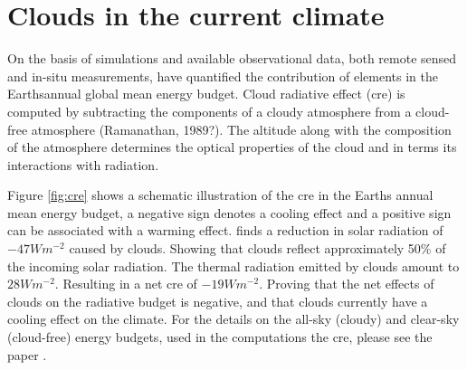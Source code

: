 \section{Clouds in the current climate} \label{sec:intro_cloud_current_climate}
On the basis of simulations and available observational data, both remote sensed and in-situ measurements, \cite{Wild2019TheModels} have quantified the contribution of elements in the Earthsannual global mean energy budget. Cloud radiative effect (\acrshort{cre}) is computed by subtracting the components of a cloudy atmosphere from a cloud-free atmosphere (Ramanathan, 1989?). The altitude along with the composition of the atmosphere determines the optical properties of the cloud and in terms its interactions with radiation.



Figure \ref{fig:cre} shows a schematic illustration of the \acrshort{cre} in the Earths annual mean energy budget, a negative sign denotes a cooling effect and a positive sign can be associated with a warming effect. %
 finds a reduction in solar radiation of $-47Wm^{-2}$ caused by clouds. Showing that clouds reflect approximately 50\% of the incoming solar radiation. The thermal radiation emitted by clouds amount to $28Wm^{-2}$. Resulting in a net \acrshort{cre} of $-19Wm^{-2}$. Proving that the net effects of clouds on the radiative budget is negative, and that clouds currently have a cooling effect on the climate. For the details on the all-sky (cloudy) and clear-sky (cloud-free) energy budgets, used in the computations the \acrshort{cre}, please see the paper . %


